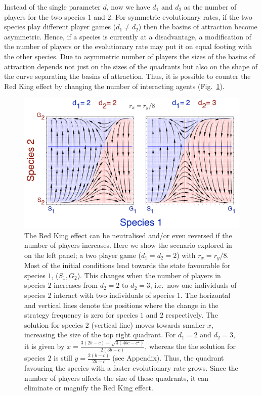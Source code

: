 \documentclass[aps,pre,amsfonts,floatfix, onecolumn,showkeys]{revtex4-1}
\begin{document}
Instead of the single parameter $d$, now we have $d_1$ and $d_2$ as the number of players for the two species $1$ and $2$.
For symmetric evolutionary rates, if the two species play different player games ($d_1 \neq d_2$) then the basins of attraction become asymmetric.
Hence, if a species is currently at a disadvantage, a modification of the number of players or the evolutionary rate may put it on equal footing with the other species. 
Due to asymmetric number of players the sizes of the basins of attraction depends not just on the sizes of the quadrants but also on the shape of the curve separating the basins of attraction.
Thus, it is possible to counter the Red King effect by changing the number of interacting agents (Fig.\ \ref{fig:counter}).

\begin{figure}
\includegraphics[width=\columnwidth]{asymplandrate.pdf}
\caption{
The Red King effect can be neutralised and/or even reversed if the number of players increases.
Here we show the scenario explored in \cite{bergstrom:PNAS:2003} on the left panel;
a two player game ($d_1 = d_2 = 2$) with $r_x=r_y/8$.
Most of the initial conditions lead towards the state favourable for species $1$, ($S_1,G_2$).
This changes when the number of players in species $2$ increases from $d_2=2$ to $d_2=3$,
i.e.\ now one individuals of species 2 interact with two individuals of species $1$. 
The horizontal and vertical lines denote the positions where the change in the strategy frequency is zero for species $1$ and $2$ respectively.
The solution for species $2$ (vertical line) moves towards smaller $x$, increasing the size of the top right quadrant.
For $d_1=2$ and $d_2=3$, it is given by $x = \frac{3 (2 b-c) - \sqrt{3 (4 b c - c^2)} }{2 (3 b -c)}$, whereas the 
the solution for species $2$ is still $ y = \frac{2(b-c)}{2 b - c}$ (see Appendix).  
Thus, the quadrant favouring the species with a faster evolutionary rate grows.
Since the number of players affects the size of these quadrants, it can eliminate or magnify the Red King effect.
}
\label{fig:counter}
\end{figure}
\end{document}

